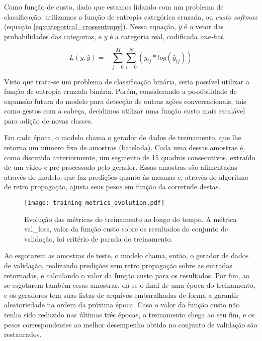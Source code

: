 Como função de custo, dado que estamos lidando com um problema de classificação, utilizamos a função de entropia categórica cruzada, ou \textit{custo softmax} (equação \ref{eq:categorical_crossentropy}).
Nessa equação, $\hat{y}$ é o vetor das probabilidades das categorias, e $y$ é a categoria real, codificada \textit{one-hot}.

\begin{equation} \label{eq:categorical_crossentropy}
    L(y,\hat{y})=-\sum\limits_{j=0}^M\sum\limits_{i=0}^N(y_{ij}*log(\hat{y}_{ij}))
\end{equation}

Visto que trata-se um problema de classificação binária, seria possível utilizar a função de entropia cruzada binária. 
Porém, considerando a possibilidade de expansão futura do modelo para detecção de outras ações conversacionais, tais como gestos com a cabeça, decidimos utilizar uma função custo mais escalável para adição de novas classes.

Em cada época, o modelo chama o gerador de dados de treinamento, que lhe retorna um número fixo de amostras (batelada).
Cada uma dessas amostras é, como discutido anteriormente, um segmento de 15 quadros consecutivos, extraído de um vídeo e pré-processado pelo gerador.
Essas amostras são alimentadas através do modelo, que faz predições quanto às mesmas e, através do algoritmo de retro propagação, ajusta seus pesos em função da corretude destas.

\begin{figure}[ht]
    \centering
    \texttt{[image: training\_metrics\_evolution.pdf]}
    \caption{Evolução das métricas do treinamento ao longo do tempo. A métrica val\_loss, valor da função custo sobre os resultados do conjunto de validação, foi critério de parada do treinamento.}
    \label{fig:train_metrics_evo}
\end{figure}

Ao esgotarem as amostras de teste, o modelo chama, então, o gerador de dados de validação, realizando predições sem retro propagação sobre as entradas retornadas, e calculando o valor da função custo para os resultados.
Por fim, ao se esgotarem também essas amostras, dá-se o final de uma época do treinamento, e os geradores tem suas listas de arquivos embaralhadas de forma a garantir aleatoriedade na ordem da próxima época.
Caso o valor da função custo não tenha sido reduzido nas últimas três épocas, o treinamento chega ao seu fim, e os pesos correspondentes ao melhor desempenho obtido no conjunto de validação são restaurados.

